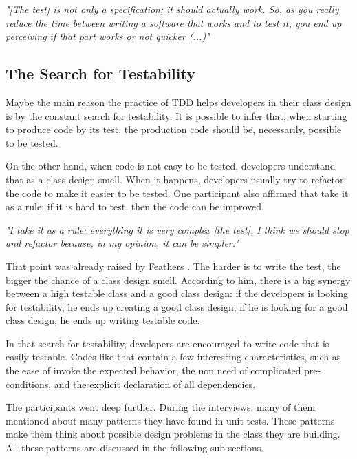 \documentclass[conference]{IEEEtran}
\begin{document}
\begin{framed}
	\textit{"[The test] is not only a specification; it should actually work. So, as you really reduce
	the time between writing a software that works and to test it, you end up perceiving if that
	part works or not quicker (...)"}
\end{framed}

\subsection{The Search for Testability}

Maybe the main reason the practice of TDD helps developers in their class design is
by the constant search for testability. It is possible to infer that,
when starting to produce code by its test, the production code should be, necessarily,
possible to be tested.

On the other hand, when code is not easy to be tested, developers understand that
as a class design smell. When it happens, developers usually try to refactor
the code to make it easier to be tested. One participant also affirmed that
take it as a rule: if it is hard to test, then the code can be improved.

\begin{framed}
	\textit{"I take it as a rule: everything it is very complex [the test],
	I think we should stop and refactor because, in my opinion, it can be simpler."}	
\end{framed}

That point was already raised by Feathers \cite{feathers-synergy}.
The harder is to write the test, the bigger the chance of a class design smell.
According to him, there is a big synergy between a high testable class and
a good class design: if the developers is looking for testability, he ends up
creating a good class design; if he is looking for a good class design, he ends
up writing testable code.

In that search for testability, developers are encouraged to write code
that is easily testable. Codes like that contain a few interesting
characteristics, such as the ease of invoke the expected behavior,
the non need of complicated pre-conditions, and the explicit declaration
of all dependencies.

The participants went deep further. During the interviews, many of them
mentioned about many patterns they have found in unit tests. These patterns
make them think about possible design problems in the class they are building.
All these patterns are discussed in the following sub-sections.
\end{document}
